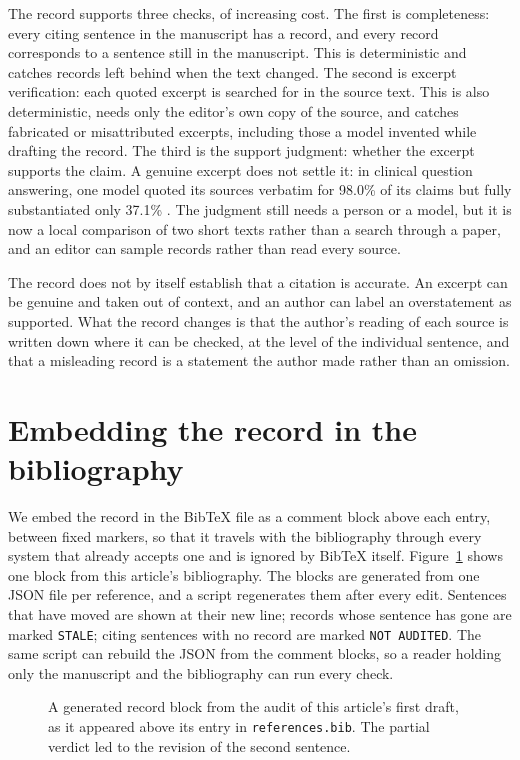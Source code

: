 \documentclass[11pt]{article}
\begin{document}
The record supports three checks, of increasing cost. The first is completeness: every citing sentence in the manuscript has a record, and every record corresponds to a sentence still in the manuscript. This is deterministic and catches records left behind when the text changed. The second is excerpt verification: each quoted excerpt is searched for in the source text. This is also deterministic, needs only the editor's own copy of the source, and catches fabricated or misattributed excerpts, including those a model invented while drafting the record. The third is the support judgment: whether the excerpt supports the claim. A genuine excerpt does not settle it: in clinical question answering, one model quoted its sources verbatim for 98.0\% of its claims but fully substantiated only 37.1\% \citep{zhang2026verifiable}. The judgment still needs a person or a model, but it is now a local comparison of two short texts rather than a search through a paper, and an editor can sample records rather than read every source.

The record does not by itself establish that a citation is accurate. An excerpt can be genuine and taken out of context, and an author can label an overstatement as supported. What the record changes is that the author's reading of each source is written down where it can be checked, at the level of the individual sentence, and that a misleading record is a statement the author made rather than an omission.

\section{Embedding the record in the bibliography}

We embed the record in the BibTeX file as a comment block above each entry, between fixed markers, so that it travels with the bibliography through every system that already accepts one and is ignored by BibTeX itself. Figure~\ref{fig:example} shows one block from this article's bibliography. The blocks are generated from one JSON file per reference, and a script regenerates them after every edit. Sentences that have moved are shown at their new line; records whose sentence has gone are marked \texttt{STALE}; citing sentences with no record are marked \texttt{NOT AUDITED}. The same script can rebuild the JSON from the comment blocks, so a reader holding only the manuscript and the bibliography can run every check.

\begin{figure}[t]
\centering
{}
\caption{A generated record block from the audit of this article's first draft, as it appeared above its entry in \texttt{references.bib}. The partial verdict led to the revision of the second sentence.}
\label{fig:example}
\end{figure}
\end{document}

